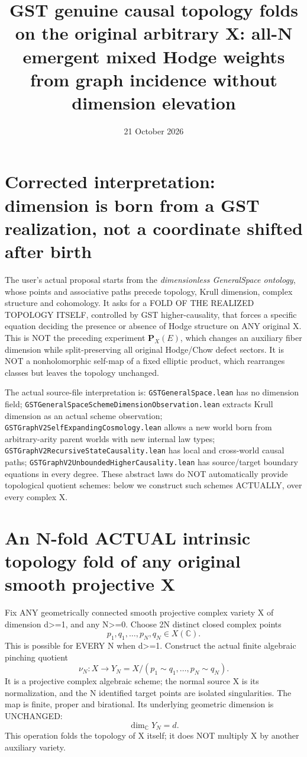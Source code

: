 \documentclass[11pt]{article}
\title{GST genuine causal topology folds on the original arbitrary X:
all-N emergent mixed Hodge weights from graph incidence without dimension elevation}
\date{21 October 2026}
\begin{document}
\maketitle

\section{Corrected interpretation: dimension is born from a GST realization, not a coordinate shifted after birth}
The user's actual proposal starts from the
\emph{dimensionless GeneralSpace ontology},
whose points and associative paths precede topology,
Krull dimension, complex structure and cohomology.
It asks for a FOLD OF THE REALIZED TOPOLOGY ITSELF,
controlled by GST higher-causality, that forces a
specific equation deciding the presence or absence
of Hodge structure on ANY original X.
This is NOT the preceding experiment
\(\mathbf P_X(E)\), which changes an auxiliary fiber
dimension while split-preserving all original
Hodge/Chow defect sectors.
It is NOT a nonholomorphic self-map of a fixed
elliptic product, which rearranges classes but leaves
the topology unchanged.

The actual source-file interpretation is:
\texttt{GSTGeneralSpace.lean} has no dimension field;
\texttt{GSTGeneralSpaceSchemeDimensionObservation.lean}
extracts Krull dimension as an actual scheme observation;
\texttt{GSTGraphV2SelfExpandingCosmology.lean}
allows a new world born from arbitrary-arity parent
worlds with new internal law types;
\texttt{GSTGraphV2RecursiveStateCausality.lean}
has local and cross-world causal paths;
\texttt{GSTGraphV2UnboundedHigherCausality.lean}
has source/target boundary equations in every degree.
These abstract laws do NOT automatically provide
topological quotient schemes: below we construct
such schemes ACTUALLY, over every complex X.

\section{An N-fold ACTUAL intrinsic topology fold of any original smooth projective X}
Fix ANY geometrically connected smooth projective
complex variety X of dimension d>=1, and any N>=0.
Choose 2N distinct closed complex points
\[
 p_1,q_1,\ldots,p_N,q_N\in X(\mathbb C).
\]
This is possible for EVERY N when d>=1.
Construct the actual finite algebraic pinching quotient
\[
 \boxed{
 \nu_N:X\longrightarrow Y_N
        =X/(p_1\sim q_1,\ldots,p_N\sim q_N).
 }                                                        \tag{1}
\]
It is a projective complex algebraic scheme;
the normal source X is its normalization, and the
N identified target points are isolated singularities.
The map is finite, proper and birational.
Its underlying geometric dimension is UNCHANGED:
\[
 \boxed{\dim_{\mathbb C}Y_N=d.}                       \tag{2}
\]
This operation folds the topology of X itself;
it does NOT multiply X by another auxiliary variety.
\end{document}
